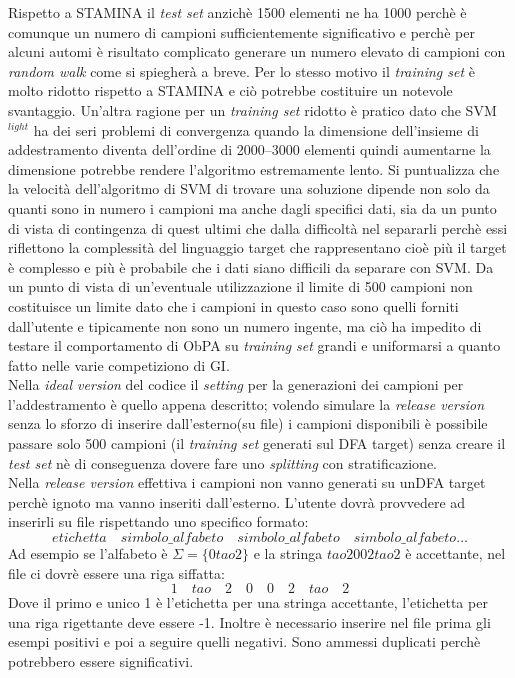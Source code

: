 Rispetto a STAMINA il \textit{test set} anzichè 1500 elementi ne ha 1000 perchè è comunque un numero di campioni sufficientemente significativo e perchè per alcuni automi è risultato  complicato generare un numero elevato di campioni con \textit{random walk} come si spiegherà a breve. Per lo stesso motivo il \textit{training set} è molto ridotto rispetto a STAMINA e ciò potrebbe costituire un notevole svantaggio. Un'altra ragione per un \textit{training set} ridotto è pratico dato che SVM$^{light}$ ha dei seri problemi di convergenza quando la dimensione dell'insieme di addestramento diventa dell'ordine di 2000--3000 elementi quindi aumentarne la dimensione potrebbe rendere l'algoritmo estremamente lento. Si puntualizza che la velocità dell'algoritmo di \ac{SVM} di trovare una soluzione dipende non solo da quanti sono in numero i campioni ma anche dagli specifici dati, sia da un punto di vista di contingenza di quest ultimi che dalla difficoltà nel separarli perchè essi riflettono la complessità del linguaggio target che rappresentano cioè più il target è complesso e più è probabile che i dati siano difficili da separare con \ac{SVM}. Da un punto di vista di un'eventuale utilizzazione il limite di 500 campioni non costituisce un limite dato che i campioni in questo caso sono quelli forniti dall'utente e tipicamente non sono un numero ingente, ma ciò ha impedito di testare il comportamento di \ac{ObPA} su \textit{training set} grandi e uniformarsi a quanto fatto nelle varie competiziono di \ac{GI}.  \\ 
 Nella \textit{ideal version} del codice il \textit{setting} per la generazioni dei campioni per l'addestramento è quello appena descritto; volendo simulare la  \textit{release version} senza lo sforzo di inserire dall'esterno(su file) i campioni disponibili è possibile passare  solo 500 campioni (il \textit{training set} generati sul \ac{DFA} target) senza creare il \textit{test set} nè di conseguenza dovere fare uno \textit{splitting} con stratificazione. \\
Nella \textit{release version} effettiva i campioni non vanno generati su un\ac{DFA} target perchè ignoto ma vanno inseriti dall'esterno. L'utente dovrà provvedere ad inserirli su file rispettando uno specifico formato:  
\begin{equation*}
etichetta \quad simbolo\_alfabeto \quad simbolo\_alfabeto \quad simbolo\_alfabeto \dots
\end{equation*}
Ad esempio se l'alfabeto è $\Sigma = \{0 tao 2\}$ e la stringa $tao2002tao2$ è accettante, nel file ci dovrè essere una riga siffatta:
\begin{equation*}
1 \quad tao \quad 2 \quad 0 \quad 0 \quad 2 \quad tao \quad 2
\end{equation*}
Dove il primo e unico 1 è l'etichetta per una stringa accettante, l'etichetta per una riga rigettante deve essere -1. Inoltre è necessario inserire nel file prima gli esempi positivi e poi a seguire quelli negativi. Sono ammessi duplicati perchè potrebbero essere significativi.\\


